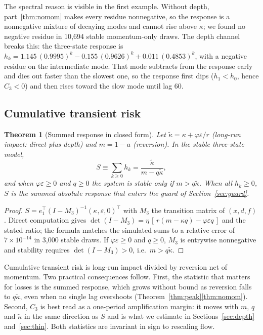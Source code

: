 \documentclass[12pt]{article}
\newtheorem{theorem}{Theorem}[section]
\theoremstyle{definition}
\theoremstyle{remark}
\begin{document}
The spectral reason is visible in the first example. Without depth, part~\ref{thm:nomom} makes every residue nonnegative, so the response is a nonnegative mixture of decaying modes and cannot rise above $\kappa$; we found no negative residue in 10{,}694 stable momentum-only draws. The depth channel breaks this: the three-state response is $h_k=1.145\,(0.9995)^k-0.155\,(0.9626)^k+0.011\,(0.4853)^k$, with a negative residue on the intermediate mode. That mode subtracts from the response early and dies out faster than the slowest one, so the response first dips ($h_1<h_0$, hence $C_3<0$) and then rises toward the slow mode until lag 60.

\subsection{Cumulative transient risk}

\begin{theorem}[Summed response in closed form]\label{thm:sum}
Let $\tilde\kappa=\kappa+\varphi\varepsilon/r$ (long-run impact: direct plus depth) and $m=1-a$ (reversion). In the stable three-state model,
\[
S\equiv\sum_{k\ge0}h_k=\frac{\tilde\kappa}{m-q\tilde\kappa},
\]
and when $\varphi\varepsilon\ge0$ and $q\ge0$ the system is stable only if $m>q\tilde\kappa$. When all $h_k\ge0$, $S$ is the summed absolute response that enters the guard of Section~\ref{sec:guard}.
\end{theorem}

\begin{proof}
$S=e_1^\top(I-M_3)^{-1}(\kappa,\varepsilon,0)^\top$ with $M_3$ the transition matrix of $(x,d,f)$. Direct computation gives $\det(I-M_3)=\eta\,[\,r(m-\kappa q)-\varphi\varepsilon q\,]$ and the stated ratio; the formula matches the simulated sums to a relative error of $7\times10^{-14}$ in 3{,}000 stable draws. If $\varphi\varepsilon\ge0$ and $q\ge0$, $M_3$ is entrywise nonnegative and stability requires $\det(I-M_3)>0$, i.e.\ $m>q\tilde\kappa$.
\end{proof}

Cumulative transient risk is long-run impact divided by reversion net of momentum. Two practical consequences follow. First, the statistic that matters for losses is the summed response, which grows without bound as reversion falls to $q\tilde\kappa$, even when no single lag overshoots (Theorem~\ref{thm:peak}\ref{thm:nomom}). Second, $C_3$ is best read as a one-period amplification margin: it moves with $m$, $q$ and $\tilde\kappa$ in the same direction as $S$ and is what we estimate in Sections~\ref{sec:depth} and~\ref{sec:thin}. Both statistics are invariant in sign to rescaling flow.
\end{document}
